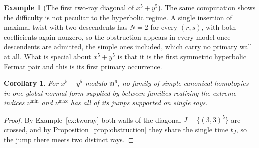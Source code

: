 \documentclass[11pt]{amsart}
\newtheorem{corollary}[theorem]{Corollary}
\theoremstyle{definition}
\newtheorem{example}[theorem]{Example}
\theoremstyle{remark}
\begin{document}
\begin{example}[The first two-ray diagonal of $x^5+y^5$]
The same computation shows the difficulty is not peculiar to the hyperbolic regime. A
single insertion of maximal twist with two descendents has $N=2$ for every $(r,s)$, with
both coefficients again nonzero, so the obstruction appears in every model once
descendents are admitted, the simple ones included, which carry no primary wall at
all. What is special about $x^{5}+y^{5}$ is that it is the first symmetric
hyperbolic Fermat pair and this is its first primary occurrence.
\end{example}

\begin{corollary}
\label{cor:nosimple}
For $x^{5}+y^{5}$ modulo $\mathfrak m^{6}$, no family of simple canonical homotopies
in one global normal form supplied by \cite[Lem.~3.40]{GKT} between families
realizing the extreme indices $\nu^{\min}$ and $\nu^{\max}$ has all of its jumps
supported on single rays.
\end{corollary}

\begin{proof}
By Example~\ref{ex:tworay} both walls of the diagonal $J=\{(3,3)^{5}\}$ are crossed,
and by Proposition~\ref{prop:obstruction} they share the single time $t_{J}$, so the
jump there meets two distinct rays.
\end{proof}
\end{document}
